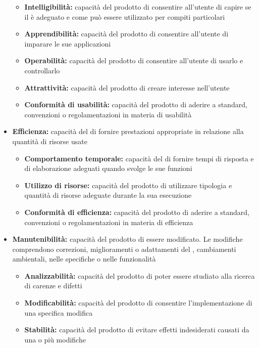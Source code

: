 \documentclass[12pt,a4paper]{article}
\begin{document}
\begin{itemize}
	\begin{itemize}
		\item \textbf{Intelligibilità:} capacità del prodotto  di consentire all'utente di capire se il  è adeguato e come può essere utilizzato per compiti	particolari
		\item \textbf{Apprendibilità:} capacità del prodotto  di consentire all'utente di imparare le sue applicazioni
		\item \textbf{Operabilità:} capacità del prodotto  di consentire all'utente di usarlo e controllarlo
		\item \textbf{Attrattività:} capacità del prodotto  di creare interesse nell'utente
		\item \textbf{Conformità di usabilità:} capacità del prodotto  di aderire a standard, convenzioni o regolamentazioni in materia di usabilità
	\end{itemize}
	\item \textbf{Efficienza:} capacità del  di fornire prestazioni appropriate in relazione alla quantità di risorse usate
	\begin{itemize}
		\item \textbf{Comportamento temporale:} capacità del  di fornire tempi di risposta e di elaborazione adeguati quando svolge le sue funzioni
		\item \textbf{Utilizzo di risorse:} capacità del prodotto  di utilizzare tipologia e quantità di risorse adeguate durante la sua esecuzione
		\item \textbf{Conformità di efficienza:} capacità del prodotto  di aderire a standard, convenzioni o regolamentazioni in materia di efficienza
	\end{itemize}
	\item \textbf{Manutenibilità:} capacità del prodotto  di essere modificato. Le modifiche comprendono correzioni, miglioramenti o adattamenti del , cambiamenti ambientali, nelle specifiche o nelle funzionalità
	\begin{itemize}
		\item \textbf{Analizzabilità:} capacità del prodotto  di poter essere studiato alla ricerca di carenze e difetti
		\item \textbf{Modificabilità:} capacità del prodotto  di consentire l'implementazione di una specifica modifica
		\item \textbf{Stabilità:} capacità del prodotto  di evitare effetti indesiderati causati da una o più modifiche

\end{itemize}
\end{itemize}
\end{document}
